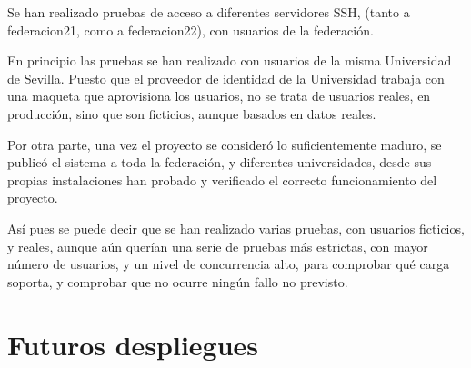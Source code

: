     Se han realizado pruebas de acceso a diferentes servidores SSH, (tanto a
    federacion21, como a federacion22), con usuarios de la federación.

    En principio las pruebas se han realizado con usuarios de la misma
    Universidad de Sevilla. Puesto que el proveedor de identidad de la
    Universidad trabaja con una maqueta que aprovisiona los usuarios, no se
    trata de usuarios reales, en producción, sino que son ficticios, aunque
    basados en datos reales.

    Por otra parte, una vez el proyecto se consideró lo suficientemente
    maduro, se publicó el sistema a toda la federación, y diferentes
    universidades, desde sus propias instalaciones han probado y verificado
    el correcto funcionamiento del proyecto.

    Así pues se puede decir que se han realizado varias pruebas, con
    usuarios ficticios, y reales, aunque aún querían una serie de pruebas
    más estrictas, con mayor número de usuarios, y un nivel de concurrencia
    alto, para comprobar qué carga soporta, y comprobar que no ocurre
    ningún fallo no previsto.

\section{Futuros despliegues}


